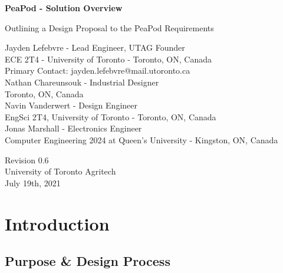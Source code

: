 \documentclass{report}
\begin{document}
\begin{titlepage}
    \begin{center}
        \vspace*{1.2cm}

        \textbf{\large{PeaPod - Solution Overview}}

        \vspace{0.5cm}

        Outlining a Design Proposal to the PeaPod Requirements

        \vfill \small{

            Jayden Lefebvre - Lead Engineer, UTAG Founder\\ECE 2T4 - University of Toronto - Toronto, ON, Canada\\Primary Contact: jayden.lefebvre@mail.utoronto.ca\\
            \vspace{.5cm}
            Nathan Chareunsouk - Industrial Designer\\Toronto, ON, Canada\\\vspace{.5cm}
            Navin Vanderwert - Design Engineer\\EngSci 2T4, University of Toronto - Toronto, ON, Canada\\\vspace{.5cm}
            Jonas Marshall - Electronics Engineer\\Computer Engineering 2024 at Queen's University - Kingston, ON, Canada

        }

        \vspace{2cm}

        Revision 0.6\\
        University of Toronto Agritech\\
        July 19th, 2021

    \end{center}
\end{titlepage}

\thispagestyle{plain}

\tableofcontents
\newpage

\section{Introduction}
\label{sec:intro}

\subsection{Purpose \& Design Process}
\label{sec:purpose}
\end{document}
